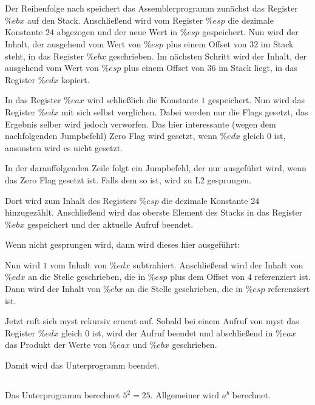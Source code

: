 \documentclass[10pt,a4paper,oneside,ngerman,numbers=noenddot]{scrartcl}
\begin{document}
\section{} %
\subsection{} %
Der Reihenfolge nach speichert das Assemblerprogramm zunächst das Register $\%ebx$ auf den Stack. Anschließend wird vom Register $\%esp$ die dezimale Konstante $24$ abgezogen und der neue Wert in $\%esp$ gespeichert. Nun wird der Inhalt, der ausgehend vom Wert von $\%esp$ plus einem Offset von $32$ im Stack steht, in das Register $\%ebx$ geschrieben. Im nächsten Schritt wird der Inhalt, der ausgehend vom Wert von $\%esp$ plus einem Offset von $36$ im Stack liegt, in das Register $\%edx$ kopiert.

In das Register $\%eax$ wird schließlich die Konstante $1$ gespeichert. Nun wird das Register $\%edx$ mit sich selbst verglichen. Dabei werden nur die Flags gesetzt, das Ergebnis selber wird jedoch verworfen. Das hier interessante (wegen dem nachfolgenden Jumpbefehl) Zero Flag wird gesetzt, wenn $\%edx$ gleich $0$ ist, ansonsten wird es nicht gesetzt.

In der darauffolgenden Zeile folgt ein Jumpbefehl, der nur ausgeführt wird, wenn das Zero Flag gesetzt ist. Falls dem so ist, wird zu L2 gesprungen.

Dort wird zum Inhalt des Registers $\%esp$ die dezimale Konstante $24$ hinzugezählt. Anschließend wird das oberste Element des Stacks in das Register $\%ebx$ gespeichert und der aktuelle Aufruf beendet.

Wenn nicht gesprungen wird, dann wird dieses hier ausgeführt:

Nun wird $1$ vom Inhalt von $\%edx$ subtrahiert. Anschließend wird der Inhalt von $\%edx$ an die Stelle geschrieben, die in $\%esp$ plus dem Offset von $4$ referenziert ist. Dann wird der Inhalt von $\%ebx$ an die Stelle geschrieben, die in $\%esp$ referenziert ist. 

Jetzt ruft sich myst rekursiv erneut auf. Sobald bei einem Aufruf von myst das Register $\%edx$ gleich $0$ ist, wird der Aufruf beendet und abschließend in $\%eax$ das  Produkt der Werte von $\%eax$ und $\%ebx$ geschrieben.

Damit wird das Unterprogramm beendet. 
\subsection{} %
Das Unterprogramm berechnet $5^{2}=25$. Allgemeiner wird $a^{b}$ berechnet.
\end{document}
